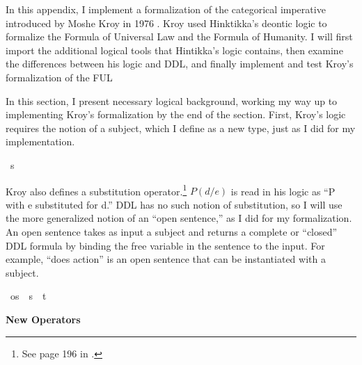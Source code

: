 \begin{isabellebody}
\begin{isamarkuptext}
\newpage%
\end{isamarkuptext}\isamarkuptrue%
%
\isadelimdocument
%
\endisadelimdocument
%
\isatagdocument
%
\isamarkuptrue%
%
\endisatagdocument
{\isafolddocument}%
%
\isadelimdocument
%
\endisadelimdocument
%
\begin{isamarkuptext}%
In this appendix, I implement a formalization of the categorical imperative introduced by Moshe Kroy in
1976 \citep{kroy}. Kroy used Hinktikka's deontic logic to formalize the Formula of Universal Law and
the Formula of Humanity. I will first import the additional logical tools that Hintikka's logic contains, 
then examine the differences between his logic and DDL, and finally implement 
and test Kroy's formalization of the FUL%
\end{isamarkuptext}\isamarkuptrue%
%
\isadelimdocument
%
\endisadelimdocument
%
\isatagdocument
%
\isamarkuptrue%
%
\endisatagdocument
{\isafolddocument}%
%
\isadelimdocument
%
\endisadelimdocument
%
\begin{isamarkuptext}%
In this section, I present necessary logical background, working my way up to implementing Kroy's
formalization by the end of the section. First, Kroy's logic requires the notion of a subject, 
which I define as a new type, just as I did for my implementation.%
\end{isamarkuptext}\isamarkuptrue%
\isamarkupfalse%
\ s\ %
%
\begin{isamarkuptext}%
Kroy also defines a substitution operator.\footnote{See page 196 in \citet{kroy}.}
$P (d/e)$ is read in his logic as ``P with e substituted 
for d.'' DDL has no such notion of substitution, so I will use the more generalized notion of an ``open 
sentence,'' as I did for my formalization. An open sentence takes as input a subject and returns a 
complete or ``closed'' DDL formula by binding the free variable in the sentence to the input. For example, 
``does action'' is an open sentence that can be instantiated with a subject.%
\end{isamarkuptext}\isamarkuptrue%
\isamarkupfalse%
\ os\ {\isacharequal}\ {\isachardoublequoteopen}{\isacharparenleft}s\ {\isasymRightarrow}\ t{\isacharparenright}{\isachardoublequoteclose}\isanewline
%
\isanewline
%
%
\begin{isamarkuptext}%
\noindent \textbf{New Operators}


\end{isamarkuptext}
\end{isabellebody}
